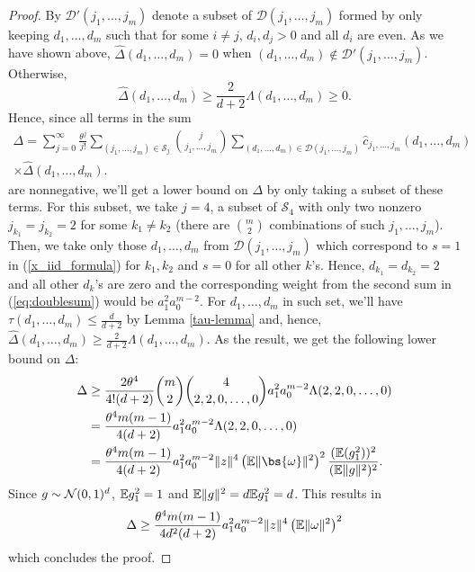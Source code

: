 \begin{proof}
By $\mathcal{D}' (j_1, \dots, j_m)$ denote a subset of $\mathcal{D} (j_1, \dots, j_m)$ formed by only keeping $d_1, \dots, d_m$ such that for some $i \neq j$, $d_i, d_j > 0$ and all $d_i$ are even. As we have shown above, $\widehat{\Delta}(d_{1},\dots,d_{m}) = 0$ when $(d_1, \dots, d_m) \notin \mathcal{D}' (j_1, \dots, j_m)$. Otherwise,
\begin{equation*}
    \widehat{\Delta}(d_{1},\dots,d_{m}) \geq \frac{2}{d + 2} \Lambda (d_{1},\dots,d_{m}) \geq 0 .
\end{equation*}
Hence, since all terms in the sum
\begin{gather}
\Delta = \sum_{j=0}^{\infty} \frac{\theta^{j}}{j!} \sum_{(j_{1},\dots,j_{m}) \in \mathcal{S}_{j}} \binom{j}{j_{1},\dots,j_{m}} \sum_{(d_{1},\dots,d_{m}) \in \mathcal{D}(j_{1},\dots,j_{m})} \widehat{c}_{j_1, \dots, j_m}(d_{1},\dots,d_{m}) \\
\times \widehat{\Delta}(d_{1},\dots,d_{m}). \label{eq:doublesum}
\end{gather}
are nonnegative, we'll get a lower bound on $\Delta$ by only taking a subset of these terms. For this subset, we take $j = 4$, a subset of $\mathcal{S}_4$ with only two nonzero $j_{k_1} = j_{k_2} = 2$ for some $k_1 \neq k_2$ (there are $\binom{m}{2}$ combinations of such $j_1, \dots, j_m$). Then, we take only those $d_1, \dots, d_m$ from $\mathcal{D} (j_1, \dots, j_m)$ which correspond to $s = 1$ in (\ref{x_iid_formula}) for $k_1, k_2$ and $s = 0$ for all other $k$'s. Hence, $d_{k_1} = d_{k_2} = 2$ and all other $d_k$'s are zero and the corresponding weight from the second sum in (\ref{eq:doublesum}) would be $a_1^2 a_0^{m - 2}$. For $d_1, \dots, d_m$ in such set, we'll have $\tau (d_1, \dots, d_m) \leq \frac{d}{d + 2}$ by Lemma \ref{tau-lemma} and, hence, $\widehat{\Delta}(d_{1},\dots,d_{m}) \geq \frac{2}{d + 2} \Lambda(d_{1},\dots,d_{m})$. As the result, we get the following lower bound on $\Delta$:
\begin{align*}
    \Delta &\geq \frac{2 \theta^4}{ 4! (d + 2)}  \binom{m}{2} \binom{4}{2, 2, 0, \dots, 0} a_1^2 a_0^{m - 2} \Lambda (2, 2, 0, \dots, 0) \\
    &= \frac{\theta^4 m (m - 1)}{4 (d + 2)} a_1^2 a_0^{m - 2} \Lambda(2, 2, 0, \dots, 0) \\
    &= \frac{\theta^4 m (m - 1)}{4 (d + 2)} a_1^2 a_0^{m - 2} \| \*z \|^4 \left( \mathbb{E} \| \bs{\omega} \|^2 \right)^2 \frac{(\mathbb{E} (\*g_1^2))^2}{(\mathbb{E} \| \*g \|^2)^2} .
\end{align*}
Since $\*g \sim \mathcal{N} (0, 1)^d$, $\mathbb{E} \*g_1^2 = 1$ and $\mathbb{E} \| \*g \|^2 = d \mathbb{E} \*g_1^2 = d$. This results in
\begin{equation}
    \Delta \geq \frac{\theta^4 m (m - 1)}{4 d^2 (d + 2)} a_1^2 a_0^{m - 2} \| \*z \|^4 \left( \mathbb{E} \| \omega \|^2 \right)^2 \label{eq:deltalb}
\end{equation}
which concludes the proof.


\end{proof}
